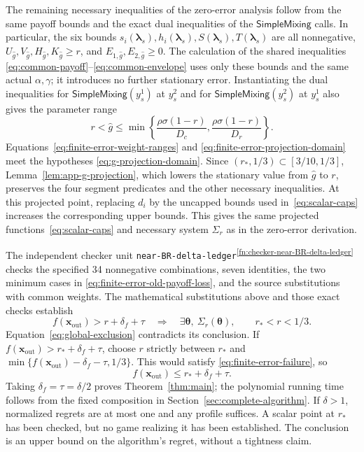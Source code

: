 \documentclass[11pt]{article}
\theoremstyle{remark}
\theoremstyle{plain}
\newcommand{\sm}{\mathsf{SimpleMixing}}
\begin{document}
The remaining necessary inequalities of the zero-error analysis
follow from the same payoff bounds and the exact dual inequalities
of the $\sm$ calls. In particular, the six bounds $s_i(\boldsymbol\lambda_s),h_i(\boldsymbol\lambda_s),S(\boldsymbol\lambda_s),T(\boldsymbol\lambda_s)$ are all
nonnegative, $U_{\hat g},V_{\hat g},H_{\hat g},K_{\hat g}\ge r$, and
$E_{1,\hat g},E_{2,\hat g}\ge0$.
The calculation of the shared inequalities \eqref{eq:common-payoff}--\eqref{eq:common-envelope}
uses only these bounds and the same actual $\alpha,\gamma$;
it introduces no further stationary error.
Instantiating the dual inequalities for $\sm(y_s^1)$ at $y_s^2$
and for $\sm(y_s^2)$ at $y_s^1$ also gives the parameter range
\begin{equation}
 r<\hat g\le\min\left\{
    \frac{\rho\sigma(1-r)}{D_c},
    \frac{\rho\sigma(1-r)}{D_r}\right\}.
 \label{eq:finite-error-projection-domain}
\end{equation}
Equations~\eqref{eq:finite-error-weight-ranges} and
\eqref{eq:finite-error-projection-domain} meet the hypotheses
\eqref{eq:g-projection-domain}. Since
$(r_*,1/3)\subset[3/10,1/3]$, Lemma~\ref{lem:app-g-projection},
which lowers the stationary value from $\hat g$ to $r$, preserves the
four segment predicates and the other necessary inequalities. At
this projected point,
replacing $d_i$ by the uncapped bounds used in~\eqref{eq:scalar-caps}
increases the corresponding upper bounds. This gives the same
projected functions~\eqref{eq:scalar-caps} and necessary system
$\Sigma_r$ as in the zero-error derivation.

The independent checker unit \nolinkurl{near-BR-delta-ledger}\textsuperscript{\ref{fn:checker-near-BR-delta-ledger}} checks
the specified 34 nonnegative
combinations, seven identities, the two minimum cases in
\eqref{eq:finite-error-old-payoff-loss}, and the source substitutions
with common weights. The mathematical substitutions above and
those exact checks establish
\begin{equation}
 f(\boldsymbol x_{\mathrm{out}})>r+\delta_f+\tau
 \quad\Longrightarrow\quad
 \exists\boldsymbol\theta,\ \Sigma_r(\boldsymbol\theta),
 \qquad r_*<r<1/3.
 \label{eq:finite-error-transfer}
\end{equation}
Equation~\eqref{eq:global-exclusion} contradicts its conclusion.
If $f(\boldsymbol x_{\mathrm{out}})>r_*+\delta_f+\tau$, choose
$r$ strictly between $r_*$ and
$\min\{f(\boldsymbol x_{\mathrm{out}})-\delta_f-\tau,1/3\}$.
This would satisfy \eqref{eq:finite-error-failure}, so
\begin{equation}
 f(\boldsymbol x_{\mathrm{out}})\le r_*+\delta_f+\tau.
 \label{eq:finite-error-bound}
\end{equation}
Taking $\delta_f=\tau=\delta/2$ proves Theorem~\ref{thm:main};
the polynomial running time follows from the fixed composition
in Section~\ref{sec:complete-algorithm}.
If $\delta>1$, normalized regrets are at most one and any profile
suffices. A scalar point at $r_*$ has been checked, but no game
realizing it has been established. The conclusion is an upper
bound on the algorithm's regret, without a tightness claim.
\end{document}
